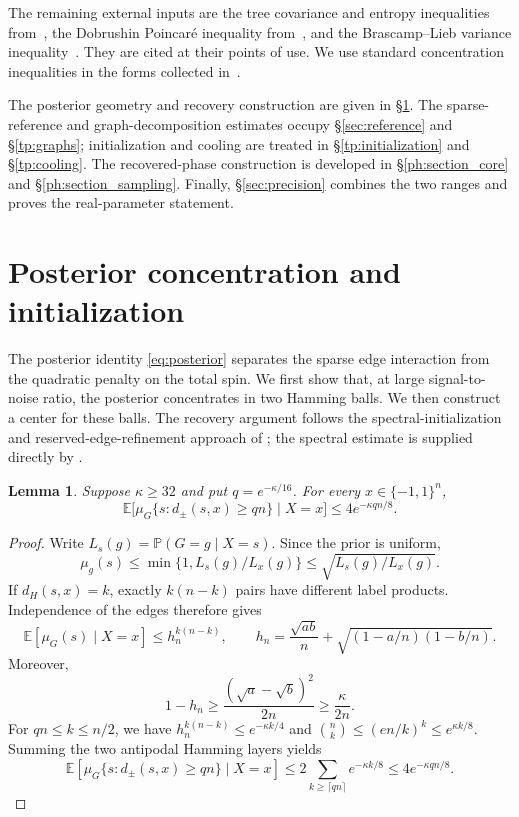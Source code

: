 \documentclass[11pt]{article}
\def\P{\mathbb{P}}
\def\E{\mathbb{E}}
\newtheorem{lemma}[thm]{Lemma}
\numberwithin{equation}{section}
\begin{document}
The remaining external inputs are the tree covariance and entropy inequalities from~\cite{LMRW24}, the Dobrushin Poincar\'e inequality from~\cite{Wu06}, and the Brascamp--Lieb variance inequality~\cite{BL76}. They are cited at their points of use. We use standard concentration inequalities in the forms collected in~\cite{BLM13}.

The posterior geometry and recovery construction are given in \S\ref{sec:foundations}. The sparse-reference and graph-decomposition estimates occupy \S\ref{sec:reference} and \S\ref{tp:graphs}; initialization and cooling are treated in \S\ref{tp:initialization} and \S\ref{tp:cooling}. The recovered-phase construction is developed in \S\ref{ph:section_core} and \S\ref{ph:section_sampling}. Finally, \S\ref{sec:precision} combines the two ranges and proves the real-parameter statement.


\section{Posterior concentration and initialization}\label{sec:foundations}

The posterior identity \eqref{eq:posterior} separates the sparse edge interaction from the quadratic penalty on the total spin. We first show that, at large signal-to-noise ratio, the posterior concentrates in two Hamming balls. We then construct a center for these balls. The recovery argument follows the spectral-initialization and reserved-edge-refinement approach of \cite{CRV15}; the spectral estimate is supplied directly by \cite[Theorem~2.1]{LLV17}.

\begin{lemma}\label{fd:concentration}
Suppose $\kappa\ge32$ and put $q=e^{-\kappa/16}$. For every $x\in\{-1,1\}^n$,
\[
 \E\big[\mu_G\{s:d_\pm(s,x)\ge qn\}\mid X=x\big]
 \le 4e^{-\kappa qn/8}.
\]
\end{lemma}

\begin{proof}
Write $L_s(g)=\P(G=g\mid X=s)$. Since the prior is uniform,
\[
 \mu_g(s)\le\min\{1,L_s(g)/L_x(g)\}
 \le\sqrt{L_s(g)/L_x(g)}.
\]
If $d_H(s,x)=k$, exactly $k(n-k)$ pairs have different label products. Independence of the edges therefore gives
\[
 \E[\mu_G(s)\mid X=x]\le h_n^{k(n-k)},\qquad
 h_n=\frac{\sqrt{ab}}n+\sqrt{(1-a/n)(1-b/n)}.
\]
Moreover,
\[
 1-h_n\ge\frac{(\sqrt a-\sqrt b)^2}{2n}
 \ge\frac\kappa{2n}.
\]
For $qn\le k\le n/2$, we have $h_n^{k(n-k)}\le e^{-\kappa k/4}$ and
$\binom nk\le(en/k)^k\le e^{\kappa k/8}$. Summing the two antipodal Hamming layers yields
\[
 \E[\mu_G\{s:d_\pm(s,x)\ge qn\}\mid X=x]
 \le2\sum_{k\ge\lceil qn\rceil}e^{-\kappa k/8}
 \le4e^{-\kappa qn/8}.
\]
\end{proof}
\end{document}
